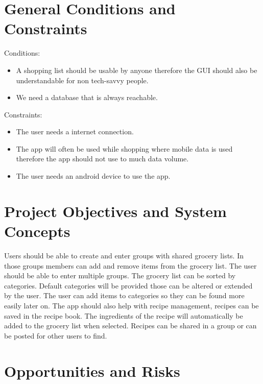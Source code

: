 \documentclass[12pt]{article}
\theoremstyle{definition}
\newenvironment{textblock}{%
   \setlength{\parindent}{0pt}
   \large
   
}{}
\begin{document}
\pagebreak

\section{General Conditions and Constraints}

\begin{textblock}

Conditions:
\begin{itemize}
\item A shopping list should be usable by anyone therefore the GUI should also be understandable for non tech-savvy people.
\item We need a database that is always reachable.
\end{itemize}
Constraints:
\begin{itemize}
\item The user needs a internet connection.
\item The app will often be used while shopping where mobile data is used therefore the app should not use to much data volume. 
\item The user needs an android device to use the app.
\end{itemize}

\end{textblock}
\pagebreak

\section{Project Objectives and System Concepts}

\begin{textblock}
Users should be able to create and enter groups with shared grocery lists. In those groups members can add and remove items from the grocery list. The user should be able to enter multiple groups. The grocery list can be sorted by categories. Default categories will be provided those can be altered or extended by the user. The user can add items to categories so they can be found more easily later on. The app should also help with recipe management, recipes can be saved in the recipe book. The ingredients of the recipe will automatically be added to the grocery list when selected. Recipes can be shared in a group or can be posted for other users to find. 
\end{textblock}

\pagebreak

\section{Opportunities and Risks}
\end{document}
